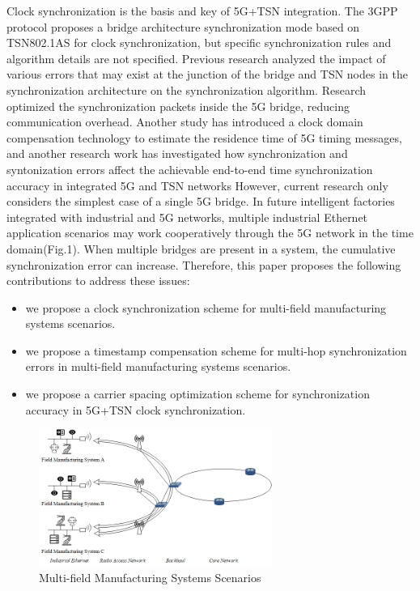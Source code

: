 \documentclass[english]{cccconf}
\begin{document}
Clock synchronization is the basis and key of 5G+TSN integration. The 3GPP protocol proposes a bridge architecture synchronization mode based on TSN802.1AS for clock synchronization, but specific synchronization rules and algorithm details are not specified\cite{888888}. Previous research analyzed the impact of various errors that may exist at the junction of the bridge and TSN nodes in the synchronization architecture on the synchronization algorithm\cite{9527833}. Research\cite{9211936} optimized the synchronization packets inside the 5G bridge, reducing communication overhead. Another study has introduced a clock domain compensation technology to estimate the residence time of 5G timing messages\cite{9674640}, and another research work has investigated how synchronization and syntonization errors affect the achievable end-to-end time synchronization accuracy in integrated 5G and TSN networks However, current research only considers the simplest case of a single 5G bridge\cite{9557468}. In future intelligent factories integrated with industrial and 5G networks, multiple industrial Ethernet application scenarios may work cooperatively through the 5G network in the time domain\cite{8402373}(Fig.1). When multiple bridges are present in a system, the cumulative synchronization error can increase. Therefore, this paper proposes the following contributions to address these issues:
\begin{itemize}
	\item we propose a clock synchronization scheme for multi-field manufacturing systems scenarios.
	\item we propose a timestamp compensation scheme for multi-hop synchronization errors in multi-field manufacturing systems scenarios.
	\item we propose a carrier spacing optimization scheme for synchronization accuracy in 5G+TSN clock synchronization.
\end{itemize}
\begin{figure}[htbp]
	\centering
	\setcounter{figure}{0}
	\includegraphics[width=3in]{fig11.png}
	\caption{Multi-field Manufacturing Systems Scenarios}
\end{figure}
\end{document}
